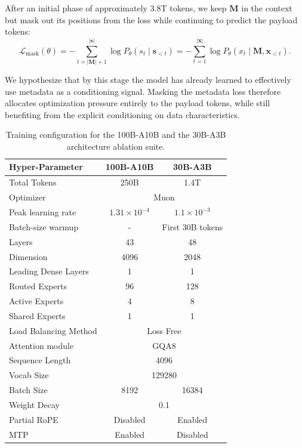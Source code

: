 After an initial phase of approximately 3.8T tokens, we keep $\mathbf{M}$ in the context but mask out its positions from the loss while continuing to predict the payload tokens:
\begin{equation}
\mathcal{L}_{\text{mask}}(\theta)
= -\sum_{t=|\mathbf{M}|+1}^{|\mathbf{s}|} \log P_\theta(s_t \mid \mathbf{s}_{<t})
= -\sum_{t=1}^{|\mathbf{x}|} \log P_\theta(x_t \mid \mathbf{M}, \mathbf{x}_{<t}).
\end{equation}

We hypothesize that by this stage the model has already learned to effectively use metadata as a conditioning signal. Masking the metadata loss therefore allocates optimization pressure entirely to the payload tokens, while still benefiting from the explicit conditioning on data characteristics.


\begin{table}[t]
\centering
\renewcommand{\arraystretch}{1.2}

\begin{tabular}{lcc}
\toprule
\rowcolor{header_gray}
\textbf{Hyper-Parameter} & \textbf{100B-A10B} & \textbf{30B-A3B} \\
\midrule
Total Tokens & 250B & 1.4T \\
Optimizer &  \multicolumn{2}{c}{Muon \cite{jordan2024muon} }\\
Peak learning rate & $1.31\times10^{-4}$ & $1.1\times10^{-3}$ \\
Batch-size warmup & - & First 30B tokens \\
\midrule
Layers & 43 & 48 \\
Dimension & 4096 & 2048 \\
Leading Dense Layers & 1 & 1 \\
Routed Experts & 96 & 128 \\
Active Experts & 4 & 8 \\
Shared Experts & 1 & 1 \\
Load Balancing Method &  \multicolumn{2}{c}{Loss Free \cite{wang2024lossfreebalancing}} \\
Attention module & \multicolumn{2}{c}{GQA8} \\
Sequence Length & \multicolumn{2}{c}{4096} \\
Vocab Size & \multicolumn{2}{c}{129280} \\
Batch Size & 8192 & 16384 \\
Weight Decay & \multicolumn{2}{c}{0.1} \\
Partial RoPE & Disabled & Enabled \\
MTP & Enabled & Disabled \\
\bottomrule
\end{tabular}
\caption{Training configuration for the 100B-A10B and the 30B-A3B architecture ablation suite.\label{tab:train_setting_1p4t}}
\end{table}

